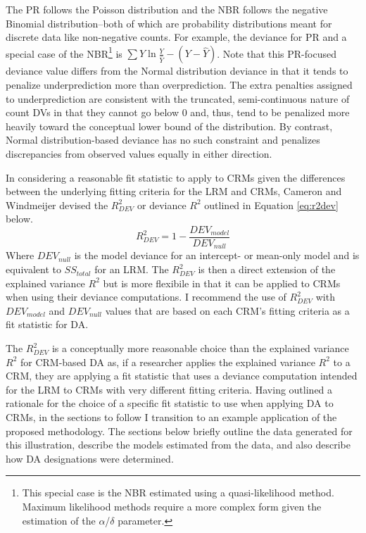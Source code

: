 \documentclass[man]{apa7}
\begin{document}
	The PR follows the Poisson distribution and the NBR follows the negative Binomial distribution--both of which are probability distributions meant for discrete data like non-negative counts.
	For example, the deviance for PR and a special case of the NBR\footnote{
		This special case is the NBR estimated using a quasi-likelihood method. 
		Maximum likelihood methods require a more complex form given the estimation of the $\alpha$/$\delta$ parameter.} 
	is $\sum Y\ln \frac{Y}{\hat{Y}} - (Y - \hat{Y})$. 
	Note that this PR-focused deviance value differs from the Normal distribution deviance in that it tends to penalize underprediction more than overprediction.
	The extra penalties assigned to underprediction are consistent with the truncated, semi-continuous nature of count DVs in that they cannot go below 0 and, thus, tend to be penalized more heavily toward the conceptual lower bound of the distribution.
	By contrast, Normal distribution-based deviance has no such constraint and penalizes discrepancies from observed values equally in either direction.
	
	In considering a reasonable fit statistic to apply to CRMs given the differences between the underlying fitting criteria for the LRM and CRMs, Cameron and Windmeijer \parencite*{cameron1996r} devised the $R^2_{DEV}$ or deviance $R^2$ outlined in Equation \ref{eq:r2dev} below.
	\begin{equation}
		R^{2}_{DEV} = 1 - \frac{DEV_{model}}{DEV_{null}}
		\label{eq:r2dev}
	\end{equation}
	Where $DEV_{null}$ is the model deviance for an intercept- or mean-only model and is equivalent to $SS_{total}$ for an LRM.
	The $R^2_{DEV}$ is then a direct extension of the explained variance $R^2$ but is more flexibile in that it can be applied to CRMs when using their deviance computations.
	I recommend the use of $R^2_{DEV}$ with $DEV_{model}$ and $DEV_{null}$ values that are based on each CRM's fitting criteria as a fit statistic for DA.
	
	The $R^2_{DEV}$ is a conceptually more reasonable choice than the explained variance $R^2$ for CRM-based DA as, if a researcher applies the explained variance $R^2$ to a CRM, they are applying a fit statistic that uses a deviance computation intended for the LRM to CRMs with very different fitting criteria. 
	Having outlined a rationale for the choice of a specific fit statistic to use when applying DA to CRMs, in the sections to follow I transition to an example application of the proposed methodology.
	The sections below briefly outline the data generated for this illustration, describe the models estimated from the data, and also describe how DA designations were determined.
	
\end{document}

